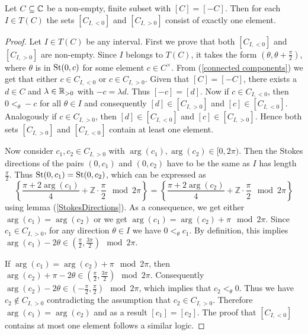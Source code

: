 \begin{lem}
Let $C \subseteq \mathbb{C}$ be a non-empty, finite subset with $[C] = [-C]$. Then
    for each $I \in T(C)$ the sets $[C_{I,<0}]$ and $[C_{I,>0}]$ consist of exactly one element.
\end{lem}
\begin{proof}
Let $I \in T(C)$ be any interval. First we prove that both $[C_{I,<0}]$ and $[C_{I,>0}]$ are non-empty. Since $I$ belongs to $T(C)$, it takes the form $(\theta, \theta + \frac{\pi}{2})$, where $\theta$ is in $ \operatorname{St}(0,c)$ for some element $c \in C^\times$. From (\ref{connected components}) we get that either $c\in C_{I, <0}$ or $c \in C_{I, >0}$. Given that $[C] = [-C]$, there exists a $d \in C$ and $\lambda \in \mathbb{R}_{>0}$ with $-c = \lambda d$. Thus $[-c]=[d]$. Now if $c \in C_{I,<0}$, then $0 <_{\theta} -c$ for all $\theta \in I$ and consequently $[d] \in [C_{I, >0}]$ and $[c] \in [C_{I,<0}]$. Analogously if $c \in C_{I, >0}$, then $[d] \in [C_{I,<0}]$ and $[c] \in [C_{I,>0}]$. Hence both sets $[C_{I,>0}]$ and $[C_{I,<0}]$ contain at least one element.

Now consider $c_1,c_2 \in C_{I,>0}$ with $\arg(c_1), \arg(c_2) \in [0,2\pi)$. Then the Stokes directions of the pairs $(0, c_1)$ and $(0,c_2)$ have to be the same as $I$ has length $\frac{\pi}{2}$. Thus $\operatorname{St}(0,c_1) = \operatorname{St}(0,c_2)$, which can be expressed as \[\left\{\frac{\pi+2\arg(c_1)}{4} + \mathbb{Z}\cdot \frac{\pi}{2} \mod 2\pi\right\} = \left\{\frac{\pi+2\arg(c_2)}{4} + \mathbb{Z}\cdot \frac{\pi}{2} \mod 2\pi\right\}\] 
using lemma (\ref{StokesDirections}). As a consequence, we get either $\arg(c_1) = \arg(c_2)$ or we get $\arg(c_1) = \arg(c_2) + \pi \mod 2\pi$. Since $c_1 \in C_{I,>0}$, for any direction $\theta \in I$ we have $0 <_{\theta}c_1$. By definition, this implies $\arg(c_1) - 2 \theta \in \left(\frac{\pi}{2}, \frac{3\pi}{2}\right) \mod 2 \pi.$ 

If $\arg(c_1) = \arg(c_2) + \pi \mod 2\pi$, then $\arg(c_2) + \pi- 2 \theta \in \left(\frac{\pi}{2}, \frac{3\pi}{2}\right) \mod 2 \pi$. Consequently $\arg(c_2)- 2 \theta \in \left(-\frac{\pi}{2}, \frac{\pi}{2}\right) \mod 2 \pi$, which implies that $c_2 <_{\theta} 0$. Thus we have $c_2 \not\in C_{I,>0}$ contradicting the assumption that $c_2 \in C_{I,>0}$. Therefore $\arg(c_1) = \arg(c_2)$ and as a result $[c_1]= [c_2]$. 
The proof that $[C_{I,<0}]$ contains at most one element follows a similar logic.
\end{proof}

